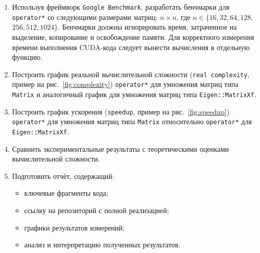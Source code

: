 \documentclass[12pt]{article}
\begin{document}
\begin{enumerate}
    \item Используя фреймворк \texttt{Google Benchmark}, разработать бенчмарки для \texttt{operator*} со следующими размерами матриц: $n \times n$, где $n \in \{16, 32, 64, 128,$ $256, 512, 1024\}$. Бенчмарки должны игнорировать время, затраченное на выделение, копирование и освобождение памяти. Для корректного измерения времени выполнения CUDA-кода следует вынести вычисления в отдельную функцию.

    \item Построить график реальной вычислительной сложности (\texttt{real complexity}, пример на рис.~\ref{fig:complexity}) \texttt{operator*} для умножения матриц типа \texttt{Matrix} и аналогичный график для умножения матриц типа \texttt{Eigen::MatrixXf}.

    \item Построить график ускорения (\texttt{speedup}, пример на рис.~\ref{fig:speedup}) \texttt{operator*} для умножения матриц типа \texttt{Matrix} относительно \texttt{operator*} для \texttt{Eigen::MatrixXf}.

    \item Сравнить экспериментальные результаты с теоретическими оценками вычислительной сложности.

    \item Подготовить отчёт, содержащий:
    \begin{itemize}
        \item ключевые фрагменты кода;
        \item ссылку на репозиторий с полной реализацией;
        \item графики результатов измерений;
        \item анализ и интерпретацию полученных результатов.
    \end{itemize}
\end{enumerate}
\end{document}
